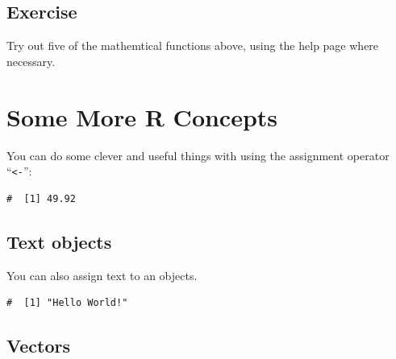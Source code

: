 \documentclass[a4paper,9pt,twocolumn,twoside,printwatermark=false]{pinp}
\begin{document}
\subsection{Exercise}\label{exercise-1}

Try out five of the mathemtical functions above, using the help page
where necessary.

\section{Some More R Concepts}\label{some-more-r-concepts}

You can do some clever and useful things with using the assignment
operator ``\texttt{\textless{}-}'':

\begin{Shaded}
\begin{Highlighting}[]
\StringTok{ }
\StringTok{ }
\StringTok{ }\OperatorTok{*}\StringTok{ }
\end{Highlighting}
\end{Shaded}

\begin{ShadedResult}
\begin{verbatim}
#  [1] 49.92
\end{verbatim}
\end{ShadedResult}

\subsection{Text objects}\label{text-objects}

You can also assign text to an objects.

\begin{Shaded}
\begin{Highlighting}[]
\end{Highlighting}
\end{Shaded}

\begin{ShadedResult}
\begin{verbatim}
#  [1] "Hello World!"
\end{verbatim}
\end{ShadedResult}

\subsection{Vectors}\label{vectors}
\end{document}
